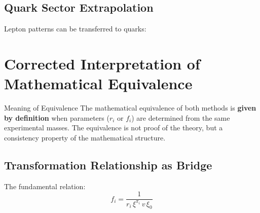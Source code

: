 	\subsection{Quark Sector Extrapolation}
	\label{subsec:quark_extrapolation}
	
	Lepton patterns can be transferred to quarks:
	
	\begin{table}[H]
		\centering


		\caption{Quark predictions from established patterns}
		\label{tab:quark_predictions}
	\end{table}
	
	\section{Corrected Interpretation of Mathematical Equivalence}
	\label{sec:corrected_interpretation}
	
	\begin{key}{Meaning of Equivalence}{}
		The mathematical equivalence of both methods is \textbf{given by definition} when parameters ($r_i$ or $f_i$) are determined from the same experimental masses. The equivalence is not proof of the theory, but a consistency property of the mathematical structure.
	\end{key}
	
	\subsection{Transformation Relationship as Bridge}
	\label{subsec:transformation_relationship}
	
	The fundamental relation:
	\begin{equation}
		f_i = \frac{1}{r_i \, \xi^{\pi_i} \, v \, \xi_0}
		\label{eq:transformation_bridge}
	\end{equation}
	
